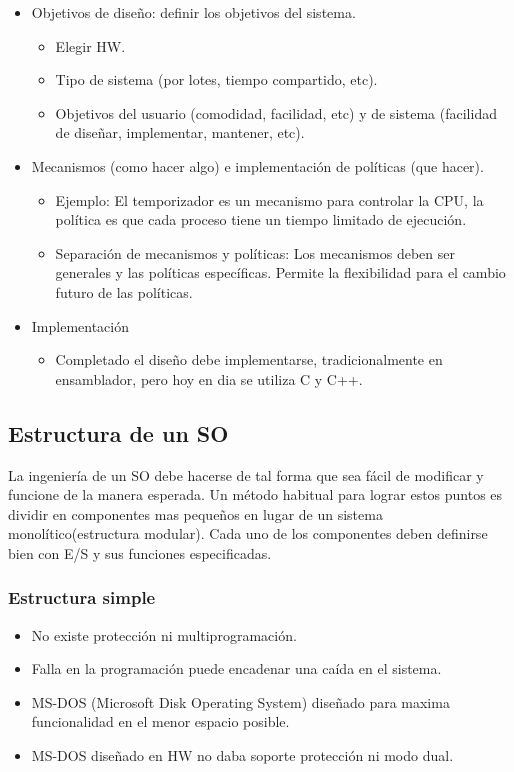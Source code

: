 \documentclass{templateNote}
\begin{document}
\begin{itemize}
    \item Objetivos de diseño: definir los objetivos del sistema.
    \begin{itemize}
        \item Elegir HW.
        \item Tipo de sistema (por lotes, tiempo compartido, etc).
        \item Objetivos del usuario (comodidad, facilidad, etc) y de sistema (facilidad de diseñar, implementar, mantener, etc).
    \end{itemize}
    \item Mecanismos (como hacer algo) e implementación de políticas (que hacer).
    \begin{itemize}
        \item Ejemplo: El temporizador es un mecanismo para controlar la CPU, la política es que cada proceso tiene un tiempo limitado de ejecución.
        \item Separación de mecanismos y políticas: Los mecanismos deben ser generales y las políticas específicas. Permite la flexibilidad para el cambio futuro de las políticas.
    \end{itemize}
    \item Implementación
    \begin{itemize}
        \item Completado el diseño debe implementarse, tradicionalmente en ensamblador, pero hoy en dia se utiliza C y C++.
    \end{itemize}
\end{itemize}

\subsection*{Estructura de un SO}

La ingeniería de un SO debe hacerse de tal forma que sea fácil de modificar y funcione de la manera esperada. Un método habitual para lograr estos puntos es dividir en componentes mas pequeños en lugar de un sistema monolítico(estructura modular).
Cada uno de los componentes deben definirse bien con E/S y sus funciones especificadas.

\subsubsection*{Estructura simple}
\begin{itemize}
    \item No existe protección ni multiprogramación.
    \item Falla en la programación puede encadenar una caída en el sistema.
    \item MS-DOS (Microsoft Disk Operating System) diseñado para maxima funcionalidad en el menor espacio posible.
    \item MS-DOS diseñado en HW no daba soporte protección ni modo dual.
\end{itemize}
\end{document}

